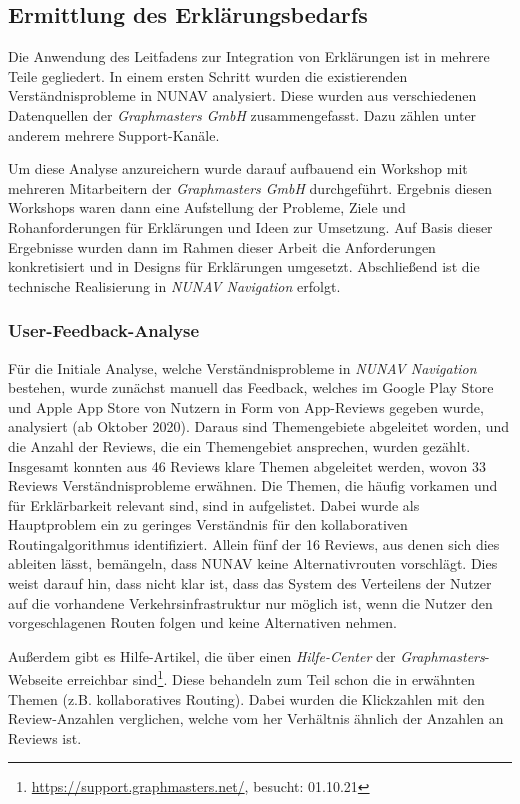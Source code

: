 \subsection{Ermittlung des Erklärungsbedarfs}
\label{sec:explanation_demand_generation}

Die Anwendung des Leitfadens zur Integration von Erklärungen ist in mehrere Teile gegliedert. In einem ersten Schritt wurden die existierenden Verständnisprobleme in NUNAV analysiert. Diese wurden aus verschiedenen Datenquellen der \textit{Graphmasters GmbH} zusammengefasst. Dazu zählen unter anderem mehrere Support-Kanäle.

Um diese Analyse anzureichern wurde darauf aufbauend ein Workshop mit mehreren Mitarbeitern der \textit{Graphmasters GmbH} durchgeführt. Ergebnis diesen Workshops waren dann eine Aufstellung der Probleme, Ziele und Rohanforderungen für Erklärungen und Ideen zur Umsetzung. Auf Basis dieser Ergebnisse wurden dann im Rahmen dieser Arbeit die Anforderungen konkretisiert und in Designs für Erklärungen umgesetzt. Abschließend ist die technische Realisierung in \textit{NUNAV Navigation} erfolgt.

\subsubsection{User-Feedback-Analyse}

Für die Initiale Analyse, welche Verständnisprobleme in \textit{NUNAV Navigation} bestehen, wurde zunächst manuell das Feedback, welches im Google Play Store und Apple App Store von Nutzern in Form von App-Reviews gegeben wurde, analysiert (ab Oktober 2020). Daraus sind Themengebiete abgeleitet worden, und die Anzahl der Reviews, die ein Themengebiet ansprechen, wurden gezählt. Insgesamt konnten aus 46 Reviews klare Themen abgeleitet werden, wovon 33 Reviews Verständnisprobleme erwähnen. Die Themen, die häufig vorkamen und für Erklärbarkeit relevant sind, sind in  aufgelistet. Dabei wurde als Hauptproblem ein zu geringes Verständnis für den kollaborativen Routingalgorithmus identifiziert. Allein fünf der 16 Reviews, aus denen sich dies ableiten lässt, bemängeln, dass NUNAV keine Alternativrouten vorschlägt. Dies weist darauf hin, dass nicht klar ist, dass das System des Verteilens der Nutzer auf die vorhandene Verkehrsinfrastruktur nur möglich ist, wenn die Nutzer den vorgeschlagenen Routen folgen und keine Alternativen nehmen.

Außerdem gibt es Hilfe-Artikel, die über einen \textit{Hilfe-Center} der \textit{Graphmasters}-Webseite erreichbar sind\footnote{\url{https://support.graphmasters.net/}, besucht: 01.10.21}. Diese behandeln zum Teil schon die in  erwähnten Themen (z.B. kollaboratives Routing). Dabei wurden die Klickzahlen mit den Review-Anzahlen verglichen, welche vom her Verhältnis ähnlich der Anzahlen an Reviews ist.

